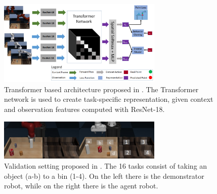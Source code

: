 \begin{figure}[t]
    \centering
    \includegraphics[width=0.7\textwidth]{figures/images/tosil/tosil_architecture.png}
    \caption{Transformer based architecture proposed in \cite{dasari2021transformers_one_shot}.  The Transformer network is used to create task-specific representation, given context and observation features computed with ResNet-18.}
    \label{fig:tosil_architecture}
\end{figure}

\begin{figure}[t]
    \centering
    \includegraphics[width=0.7\textwidth]{figures/images/tosil/tosil_task.png}
    \caption{Validation setting proposed in \cite{dasari2021transformers_one_shot}. The
    16 tasks consist of taking an object (a-b) to a bin (1-4). On the left there is the demonstrator robot, while on the right there is the agent robot.}
    \label{fig:tosil_task}
\end{figure}